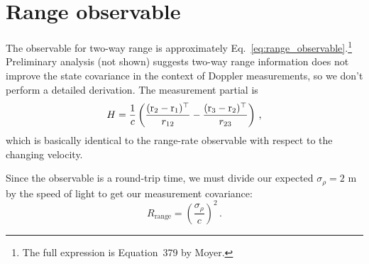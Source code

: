\documentclass[12pt]{article}
\begin{document}
\section{Range observable}
The observable for two-way range is approximately Eq.~\ref{eq:range_observable}.\footnote{The full expression is Equation~379 by Moyer.} Preliminary analysis (not shown) suggests two-way range information does not improve the state covariance in the context of Doppler measurements, so we don't perform a detailed derivation. The measurement partial is
\begin{equation}
H = \frac{1}{c}\left( \frac{(\mathrm{r}_2 - \mathrm{r}_1)^\top}{r_{12}} - \frac{(\mathrm{r}_3 - \mathrm{r}_2)^\top}{r_{23}}\right)\,\text{,}
\end{equation}
which is basically identical to the range-rate observable with respect to the changing velocity.

Since the observable is a round-trip time, we must divide our expected $\sigma_\rho = 2\text{ m}$ by the speed of light to get our measurement covariance:
\begin{equation}
R_\text{range} = \left(\frac{\sigma_\rho}{c}\right)^2\,\text{.}
\end{equation}


\end{document}

